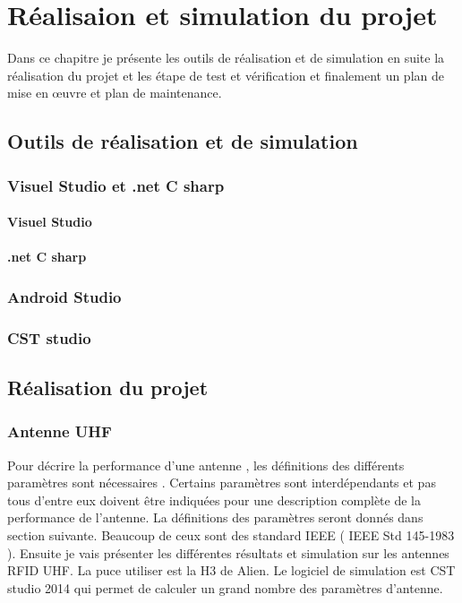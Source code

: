 \documentclass[11pt, a4paper, twoside]{book}
\begin{document}
\chapter{Réalisaion et simulation du projet}
Dans ce chapitre je présente les outils	de	réalisation	et de	simulation en suite la réalisation	du projet et les étape de test	 et vérification et finalement un plan de mise en œuvre et plan de maintenance.
\section{Outils	de	réalisation	et de	simulation}
\subsection{Visuel Studio et .net C sharp}
\subsubsection{Visuel Studio}
\subsubsection{.net C sharp}
\subsection{Android Studio}
\subsection{CST studio}

\section{Réalisation	du	projet}
\subsection{Antenne UHF}

Pour décrire la performance d'une antenne , les définitions des différents paramètres sont nécessaires . Certains paramètres sont interdépendants et pas tous d'entre eux doivent être indiquées pour une description complète de la performance de l'antenne. La définitions des paramètres seront donnés dans section suivante. Beaucoup de ceux sont des standard IEEE  ( IEEE Std 145-1983 ). Ensuite je vais présenter les différentes résultats et simulation sur les antennes RFID UHF. La puce utiliser est la H3 de Alien. Le logiciel de simulation est CST studio 2014 qui permet de calculer un grand nombre des paramètres d'antenne.\\
\end{document}
